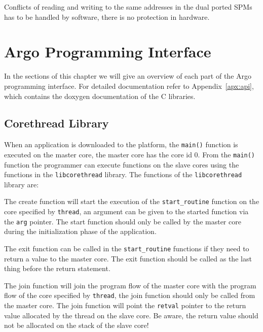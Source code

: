\documentclass[a4paper,fontsize=10pt,twoside,DIV15,BCOR12mm,headinclude=true,footinclude=false,pagesize,bibtotoc]{scrbook}
\newcommand{\code}[1]{{\texttt{#1}}}
\renewenvironment{description}%
{
\begin{basedescript}{
\desclabelstyle{\nextlinelabel}
\renewcommand{\makelabel}[1]{%
\parbox[b]{\textwidth}{\bfseries##1}%
}%
\desclabelwidth{2em}}}
{
\end{basedescript}
}
\begin{document}
Conflicts of reading and writing to the same addresses in the dual
ported SPMs has to be handled by software, there is no protection in hardware.


\chapter{Argo Programming Interface}
\label{chap:api}
In the sections of this chapter we will give an overview of each part of the Argo programming interface.
For detailed documentation refer to Appendix~\ref{apx:api}, which contains the doxygen documentation of the C libraries.

\section{Corethread Library}
\label{sec:cthread}
When an application is downloaded to the platform, the \code{main()} function is executed on the master core, the master core has the core id 0.
From the \code{main()} function the programmer can execute functions on the slave cores using the functions in the \code{libcorethread} library.
The functions of the \code{libcorethread} library are:
\begin{description}
\item[\code{int corethread\_create( corethread\_t *thread, void(*start\_routine)(void *), void *arg ) )}]

The create function will start the execution of the \code{start\_routine} function on the core specified by \code{thread}, an argument can be given to the started function via the \code{arg} pointer. The start function should only be called by the master core during the initialization phase of the application.

\item[\code{void corethread\_exit( void * retval )}]

The exit function can be called in the \code{start\_routine} functions if they need to return a value to the master core.
The exit function should be called as the last thing before the return statement.

\item[\code{int corethread\_join( corethread\_t thread, void ** retval )}]

The join function will join the program flow of the master core with the program flow of the core specified by \code{thread}, the join function should only be called from the master core. The join function will point the \code{retval} pointer to the return value allocated by the thread on the slave core. Be aware, the return value should not be allocated on the stack of the slave core!

\end{description}
\end{document}
